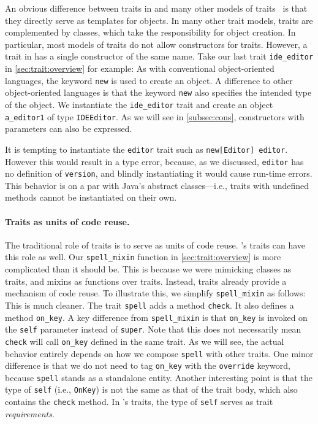 An obvious difference between traits in \sedel and many other models of
traits~\citep{scharli2003traits,fisher2004typed,odersky2005scalable} is that they
directly serve as templates for objects. In many other trait models, traits are
complemented by classes, which take the responsibility for object creation. In
particular, most models of traits do not allow constructors for traits. However,
a trait in \sedel has a single constructor of the same name. Take our last trait
\lstinline{ide_editor} in \cref{sec:trait:overview} for example:
As with conventional object-oriented languages, the keyword \lstinline{new} is used to create
an object. A difference to other object-oriented languages is that the keyword
\lstinline{new} also specifies the intended type of the object. We instantiate
the \lstinline{ide_editor} trait and create an object \lstinline{a_editor1} of
type \lstinline{IDEEditor}. As we will see in \cref{subsec:cons}, constructors
with parameters can also be expressed.

It is tempting to instantiate the \lstinline{editor} trait such as
\lstinline{new[Editor] editor}. However this would result in a type error, because, as
we discussed, \lstinline{editor} has no definition of \lstinline{version}, and
blindly instantiating it would cause run-time errors. This behavior is on a par
with Java's abstract classes---i.e., traits with undefined methods cannot be instantiated on their own.

\paragraph{Traits as units of code reuse.}

The traditional role of traits is to serve as units of code reuse. \sedel's traits
can have this role as well.
Our \lstinline{spell_mixin} function in \cref{sec:trait:overview} is more complicated than it should be.
This is because we were mimicking classes as traits, and
mixins as functions over traits. Instead, traits already provide a mechanism of
code reuse. To illustrate this, we simplify \lstinline{spell_mixin} as follows:
This is much cleaner. The trait \lstinline{spell} adds a method
\lstinline{check}. It also defines a method \lstinline{on_key}.
A key difference from \lstinline{spell_mixin} is that \lstinline{on_key} is invoked on the \lstinline{self}
parameter instead of \lstinline{super}. Note that this does not necessarily mean \lstinline{check} will call \lstinline{on_key}
defined in the same trait. As we will see, the actual behavior entirely depends on how we compose \lstinline{spell}
with other traits. One minor difference is that we do not need to tag \lstinline{on_key}
with the \lstinline{override} keyword, because \lstinline{spell} stands as a standalone entity.
Another interesting point is that the type of \lstinline{self} (i.e., \lstinline{OnKey})
is not the same as that of the trait body, which also contains the \lstinline{check} method.
In \sedel's traits, the type of \lstinline{self} serves as trait \emph{requirements}.


